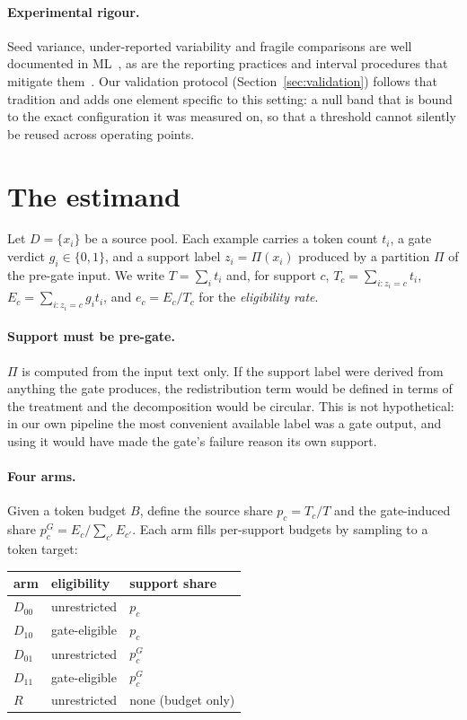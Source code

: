 \documentclass[10pt,twocolumn]{article}
\begin{document}
\paragraph{Experimental rigour.}
Seed variance, under-reported variability and fragile comparisons are well documented in
ML~\citep{henderson2018deep,picard2021torch,dodge2019show}, as are the reporting practices and
interval procedures that mitigate
them~\citep{pineau2021improving,bouthillier2021accounting,agarwal2021deep}. Our validation
protocol (Section~\ref{sec:validation}) follows that tradition and adds one element specific to
this setting: a null band that is bound to the exact configuration it was measured on, so that a
threshold cannot silently be reused across operating points.

\section{The estimand}
\label{sec:estimand}

Let $D=\{x_i\}$ be a source pool. Each example carries a token count $t_i$, a gate verdict
$g_i\in\{0,1\}$, and a support label $z_i=\Pi(x_i)$ produced by a partition $\Pi$ of the
pre-gate input. We write $T=\sum_i t_i$ and, for support $c$,
$T_c=\sum_{i:z_i=c} t_i$, $E_c=\sum_{i:z_i=c} g_i t_i$, and $e_c=E_c/T_c$ for the
\emph{eligibility rate}.

\paragraph{Support must be pre-gate.}
$\Pi$ is computed from the input text only. If the support label were derived from anything the
gate produces, the redistribution term would be defined in terms of the treatment and the
decomposition would be circular. This is not hypothetical: in our own pipeline the most
convenient available label was a gate output, and using it would have made the gate's failure
reason its own support.

\paragraph{Four arms.}
Given a token budget $B$, define the source share $p_c=T_c/T$ and the gate-induced share
$p^G_c=E_c/\sum_{c'}E_{c'}$. Each arm fills per-support budgets by sampling to a token target:

\begin{center}
\begin{tabular}{lll}
\toprule
arm & eligibility & support share \\
\midrule
$D_{00}$ & unrestricted & $p_c$ \\
$D_{10}$ & gate-eligible & $p_c$ \\
$D_{01}$ & unrestricted & $p^G_c$ \\
$D_{11}$ & gate-eligible & $p^G_c$ \\
\midrule
$R$ & unrestricted & none (budget only) \\
\bottomrule
\end{tabular}
\end{center}
\end{document}
